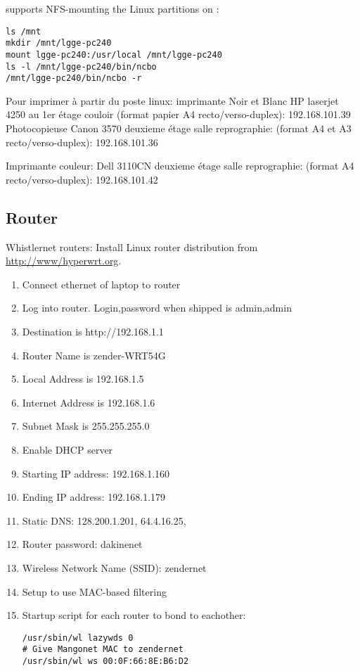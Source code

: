 \documentclass[12pt,twoside]{article}
\begin{document}
 supports NFS-mounting the Linux partitions
on :
\begin{verbatim}
ls /mnt
mkdir /mnt/lgge-pc240
mount lgge-pc240:/usr/local /mnt/lgge-pc240
ls -l /mnt/lgge-pc240/bin/ncbo
/mnt/lgge-pc240/bin/ncbo -r
\end{verbatim}

Pour imprimer à partir du poste linux:
imprimante Noir et Blanc
HP laserjet 4250 au 1er étage couloir (format papier A4
recto/verso-duplex): 192.168.101.39 
Photocopieuse Canon 3570 deuxieme étage salle reprographie: (format A4
et A3 recto/verso-duplex): 192.168.101.36 

Imprimante couleur:
Dell 3110CN deuxieme étage salle reprographie: (format A4
recto/verso-duplex): 192.168.101.42 

\subsection{Router}\label{sxn:rtr}
Whistlernet routers: 
Install  Linux router distribution from 
\url{http://www/hyperwrt.org}.
\begin{enumerate}
\item Connect ethernet of laptop to router
\item Log into router. Login,password when shipped is admin,admin
\item Destination is http://192.168.1.1
\item Router Name is zender-WRT54G
\item Local Address is 192.168.1.5
\item Internet Address is 192.168.1.6
\item Subnet Mask is 255.255.255.0
\item Enable DHCP server
\item Starting IP address: 192.168.1.160
\item Ending IP address: 192.168.1.179
\item Static DNS: 128.200.1.201, 64.4.16.25, 
\item Router password: dakinenet
\item Wireless Network Name (SSID): zendernet
\item Setup to use MAC-based filtering
\item Startup script for each router to bond to eachother:
\begin{verbatim}
/usr/sbin/wl lazywds 0
# Give Mangonet MAC to zendernet
/usr/sbin/wl ws 00:0F:66:8E:B6:D2
\end{verbatim}
\end{enumerate}
\end{document}
